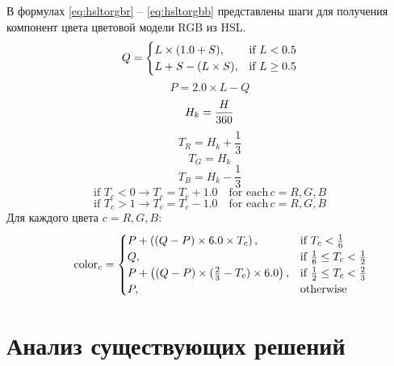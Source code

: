 \documentclass[a4paper,14pt, unknownkeysallowed]{extreport}
\begin{document}
    В формулах \ref{eq:hsltorgbr} -- \ref{eq:hsltorgbb} представлены шаги для получения компонент цвета цветовой модели RGB из HSL.
    \begin{equation}
        {\label{eq:hsltorgbr}\displaystyle Q={\begin{cases}L\times (1.0+S),&{\mbox{if }}L<0.5\\L+S-(L\times S),&{\mbox{if }}L\geq 0.5\end{cases}}}
    \end{equation}
    \begin{equation}
        {\displaystyle P=2.0\times L-Q}
    \end{equation}
    \begin{equation}
        {\displaystyle H_{k}={H \over 360}}
    \end{equation}
    \begin{equation}
        {\displaystyle T_{R}=H_{k}+{\frac {1}{3}}}
    \end{equation}
    \begin{equation}
        {\displaystyle T_{G}=H_{k}}
    \end{equation}
    \begin{equation}
        {\displaystyle T_{B}=H_{k}-{\frac {1}{3}}}
    \end{equation}
    \begin{equation}
        {\displaystyle {\mbox{if }}T_{c}<0\rightarrow T_{c}=T_{c}+1.0\quad {\mbox{for each}}\,c=R,G,B}
    \end{equation}
    \begin{equation}
        {\displaystyle {\mbox{if }}T_{c}>1\rightarrow T_{c}=T_{c}-1.0\quad {\mbox{for each}}\,c=R,G,B}
    \end{equation}
    Для каждого цвета $c = R,G,B$:
    \begin{equation}
        {\label{eq:hsltorgbb}\displaystyle \qquad \mathrm {color} _{c}={\begin{cases}P+\left((Q-P)\times 6.0\times T_{c}\right),&{\mbox{if }}T_{c}<{\frac {1}{6}}\\Q,&{\mbox{if }}{\frac {1}{6}}\leq T_{c}<{\frac {1}{2}}\\P+\left((Q-P)\times ({\frac {2}{3}}-T_{c})\times 6.0\right),&{\mbox{if }}{\frac {1}{2}}\leq T_{c}<{\frac {2}{3}}\\P,&{\mbox{otherwise }}\end{cases}}}
    \end{equation}

    \section{Анализ существующих решений}
\end{document}
